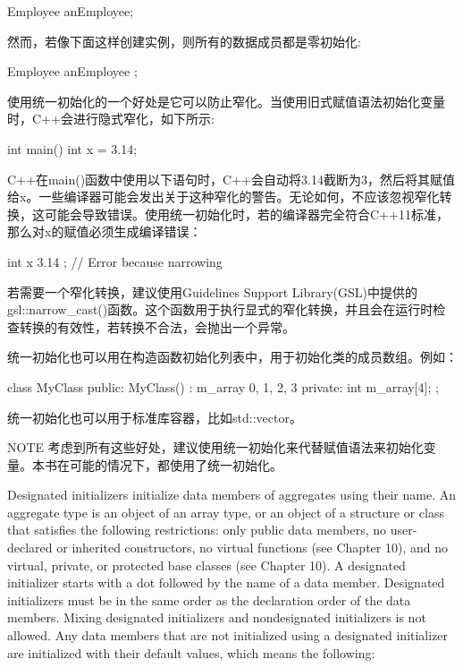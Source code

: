 \begin{cpp}
Employee anEmployee;
\end{cpp}

然而，若像下面这样创建实例，则所有的数据成员都是零初始化:

\begin{cpp}
Employee anEmployee { };
\end{cpp}

使用统一初始化的一个好处是它可以防止窄化。当使用旧式赋值语法初始化变量时，C++会进行隐式窄化，如下所示:

\begin{cpp}
int main()
{
    int x = 3.14;
}
\end{cpp}

C++在main()函数中使用以下语句时，C++会自动将3.14截断为3，然后将其赋值给x。一些编译器可能会发出关于这种窄化的警告。无论如何，不应该忽视窄化转换，这可能会导致错误。使用统一初始化时，若的编译器完全符合C++11标准，那么对x的赋值必须生成编译错误：

\begin{cpp}
int x { 3.14 }; // Error because narrowing
\end{cpp}

若需要一个窄化转换，建议使用Guidelines Support Library(GSL)中提供的gsl::narrow\_cast()函数。这个函数用于执行显式的窄化转换，并且会在运行时检查转换的有效性，若转换不合法，会抛出一个异常。

统一初始化也可以用在构造函数初始化列表中，用于初始化类的成员数组。例如：

\begin{cpp}
class MyClass
{
    public:
        MyClass()
            : m_array { 0, 1, 2, 3 }
        {
        }
    private:
        int m_array[4];
};
\end{cpp}

统一初始化也可以用于标准库容器，比如std::vector。

\begin{myNotic}{NOTE}
考虑到所有这些好处，建议使用统一初始化来代替赋值语法来初始化变量。本书在可能的情况下，都使用了统一初始化。
\end{myNotic}


Designated initializers initialize data members of aggregates using their name. An aggregate type is an object of an array type, or an object of a structure or class that satisfies the following restrictions: only public data members, no user-declared or inherited constructors, no virtual functions (see Chapter 10), and no virtual, private, or protected base classes (see Chapter 10). A designated initializer starts with a dot followed by the name of a data member. Designated initializers must be in the same order as the declaration order of the data members. Mixing designated initializers and nondesignated initializers is not allowed. Any data members that are not initialized using a designated initializer are initialized with their default values, which means the following:

